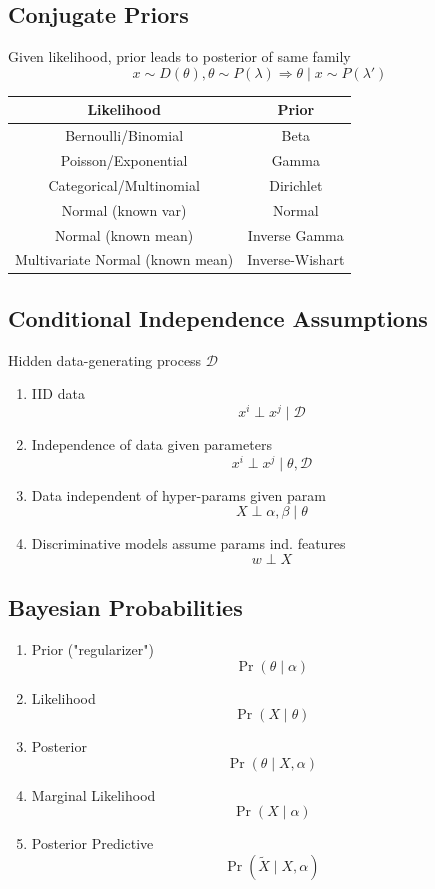 \subsection*{Conjugate Priors}
Given likelihood, prior leads to posterior of same family\\
\[x\sim D(\theta), \theta\sim P(\lambda) \Rightarrow \theta\mid x \sim P(\lambda')\]
\begin{center}
\begin{tabular}{||c c||} 
    \hline
    Likelihood & Prior \\ [0.5ex] 
    \hline\hline
    Bernoulli/Binomial & Beta  \\ 
    \hline
    Poisson/Exponential & Gamma\\
    \hline
    Categorical/Multinomial & Dirichlet \\
    \hline
    Normal (known var) & Normal \\
    \hline
    Normal (known mean) & Inverse Gamma\\
    \hline
    Multivariate Normal (known mean) & Inverse-Wishart\\ [1ex] 
    \hline
\end{tabular}
\end{center}
\subsection*{Conditional Independence Assumptions}
Hidden data-generating process $\mathcal{D}$
\begin{enumerate}
    \item IID data
    \[x^i\perp x^j \mid \mathcal{D}\]
    \item Independence of data given parameters
    \[x^i\perp x^j \mid \theta,\mathcal{D}\]
    \item Data independent of hyper-params given param
    \[X\perp \alpha,\beta \mid \theta\]
    \item Discriminative models assume params ind. features
    \[w\perp X\]
\end{enumerate}
\subsection*{Bayesian Probabilities}
\begin{enumerate}
    \item Prior ("regularizer")
    \[\Pr(\theta\mid\alpha)\]
    \item Likelihood
    \[\Pr(X\mid\theta)\]
    \item Posterior
    \[\Pr(\theta\mid X,\alpha)\]
    \item Marginal Likelihood
    \[\Pr(X\mid\alpha)\]
    \item Posterior Predictive
    \[\Pr(\tilde{X}\mid X,\alpha)\]
\end{enumerate}
